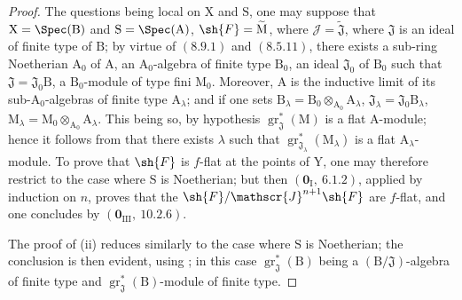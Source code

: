 \begin{proof}
The questions being local on $\mathrm{X}$ and $\mathrm{S}$, one may suppose that $\mathrm{X}=\Spec(\mathrm{B})$ and $\mathrm{S}=\Spec(\mathrm{A})$, $\sh{F}=\widetilde{\mathrm{M}}$, where $\mathscr{J}=\widetilde{\mathfrak{J}}$, where $\mathfrak{J}$ is an ideal of finite type of $\mathrm{B}$; by virtue of $(8.9.1)$ and $(8.5.11)$, there exists a sub-ring Noetherian $\mathrm{A}_0$ of $\mathrm{A}$, an $\mathrm{A}_0$-algebra of finite type $\mathrm{B}_0$, an ideal $\mathfrak{J}_0$ of $\mathrm{B}_0$ such that $\mathfrak{J}=\mathfrak{J}_0\mathrm{B}$, a $\mathrm{B}_0$-module of type fini $\mathrm{M}_0$. Moreover, $\mathrm{A}$ is the inductive limit of its sub-$\mathrm{A}_0$-algebras of finite type $\mathrm{A}_\lambda$; and if one sets $\mathrm{B}_\lambda=\mathrm{B}_0\otimes_{\mathrm{A}_0}\mathrm{A}_\lambda$, $\mathfrak{J}_\lambda=\mathfrak{J}_0\mathrm{B}_\lambda$, $\mathrm{M}_\lambda=\mathrm{M}_0\otimes_{\mathrm{A}_0}\mathrm{A}_\lambda$. This being so, by hypothesis $\operatorname{gr}^*_\mathfrak{J}(\mathrm{M})$ is a flat A-module; hence it follows from  that there exists $\lambda$ such that $\operatorname{gr}^*_{\mathfrak{J}_\lambda}(\mathrm{M}_\lambda)$ is a flat $\mathrm{A}_\lambda$-module. To prove that $\sh{F}$ is $f$-flat at the points of $\mathrm{Y}$, one may therefore restrict to the case where $\mathrm{S}$ is Noetherian; but then $(\mathbf{0}_\mathrm{I},~6.1.2)$, applied by induction on $n$, proves that the $\sh{F}/\mathscr{J}^{n+1}\sh{F}$ are $f$-flat, and one concludes by $(\mathbf{0}_{\mathrm{III}},~10.2.6)$.

The proof of (ii) reduces similarly to the case where $\mathrm{S}$ is Noetherian; the conclusion is then evident, using ; in this case $\operatorname{gr}^*_\mathfrak{J}(\mathrm{B})$ being a $(\mathrm{B}/\mathfrak{J})$-algebra of finite type and $\operatorname{gr}^*_\mathfrak{J}(\mathrm{B})$-module of finite type.


\end{proof}
